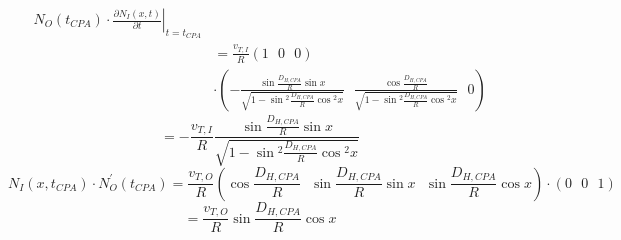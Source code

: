 \begin{theappendices}
\begin{equation*}
\begin{aligned}
        N_{O}(t_{CPA}) \cdot \left. \frac{\partial N_{I}(x,t)}{\partial t} \right|_{t=t_{CPA}} \\
        &= \frac{v_{T,I}}{R}(1 \ \ \ 0 \ \ \ 0) \\
        &\cdot \left( -\frac{\sin{\frac{D_{H,CPA}}{R}}\sin{x}}{\sqrt{1 - \sin{^{2}\frac{D_{H,CPA}}{R}}\cos{^{2}x}}} \ \ \ \frac{\cos{\frac{D_{H,CPA}}{R}}}{\sqrt{1-\sin{^{2}\frac{D_{H,CPA}}{R}}\cos{^{2}x}}} \ \ \ 0\right)
    \end{aligned}
\end{equation*}
\[= -\frac{v_{T,I}}{R}\frac{\sin{\frac{D_{H,CPA}}{R}}\sin{x}}{\sqrt{1-\sin{^{2}\frac{D_{H,CPA}}{R}}\cos{^{2}x}}}\]
\[N_{I}(x,t_{CPA}) \cdot N^{'}_{O}(t_{CPA}) = \frac{v_{T,O}}{R} \left( \cos{\frac{D_{H,CPA}}{R}} \ \ \ \sin{\frac{D_{H,CPA}}{R}\sin{x}} \ \ \ \sin{\frac{D_{H,CPA}}{R}\cos{x}} \right) \cdot (0 \ \ \ 0 \ \ \ 1)\]
\[= \frac{v_{T,O}}{R}\sin{\frac{D_{H,CPA}}{R}\cos{x}} \]


\end{theappendices}
